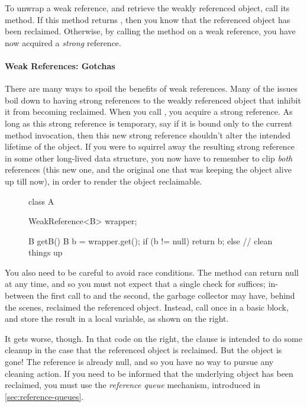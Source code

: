 To unwrap a weak reference, and retrieve the weakly referenced object, call its
 method. If this method returns , then you know that the
referenced object has been reclaimed. Otherwise, by calling the 
method on a weak reference, you have now acquired a \emph{strong} reference.

\paragraph{Weak References: Gotchas}
There are many ways to spoil the benefits of weak references. Many of the issues
boil down to having strong references to the weakly referenced object that
inhibit it from becoming reclaimed. When you call , you acquire a
strong reference. As long as this strong reference is temporary, say if it is
bound only to the current method invocation, then this new strong reference
shouldn't alter the intended lifetime of the object.   If you were to squirrel
away the resulting strong reference in some other long-lived data structure, you
now have to remember to clip \emph{both} references (this new one, and the
original one that was keeping the object alive up till now), in order to render
the object reclaimable.


\begin{figure}
\centering
\begin{framedlisting}
class A {
  WeakReference<B> wrapper;
   
  B getB() {
    B b = wrapper.get();
    if (b != null) {
      return b;
    } else {
      // clean things up
    }
  }
}
\end{framedlisting}
\end{figure}
You also need to be careful to avoid race conditions. The  method can
return null at any time, and so you must not expect that a single check for
 suffices; in-between the first call to  and the second,
the garbage collector may have, behind the scenes, reclaimed the referenced
object. Instead, call  once in a basic block, and store the result in
a local variable, as shown on the right.

It gets worse, though. In that code on the right, the  clause is
intended to do some cleanup in the case that the referenced object is reclaimed.
But the object is gone! The reference is already null, and so you have no way to
pursue any cleaning action. If you need to be informed that the underlying
object has been reclaimed, you must use the \emph{reference queue} mechanism,
introduced in \autoref{sec:reference-queues}.

